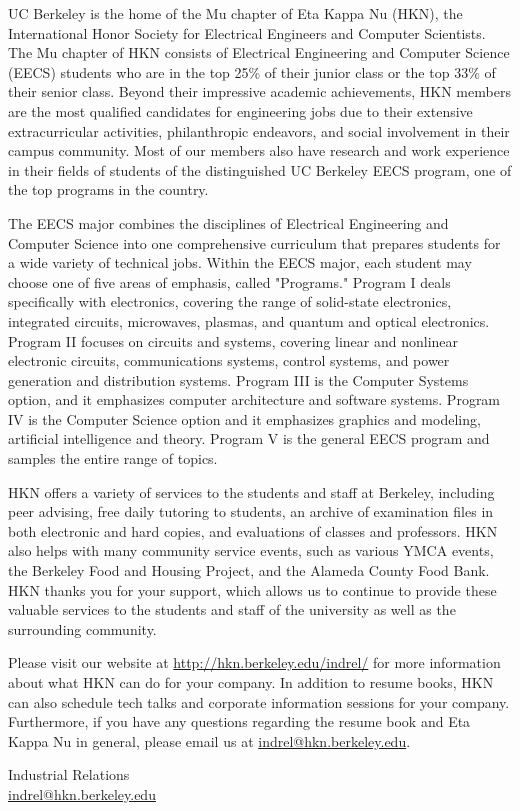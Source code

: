 \documentclass[11pt]{article}
\begin{document}
UC Berkeley is the home of the Mu chapter of Eta Kappa Nu (HKN), the International Honor Society
for Electrical Engineers and Computer Scientists. The Mu chapter of HKN consists of Electrical Engineering
and Computer Science (EECS) students who are in the top 25\% of their junior class or the top 33\% of their
senior class. Beyond their impressive academic achievements, HKN members are the most qualified
candidates for engineering jobs due to their extensive extracurricular activities, philanthropic endeavors,
and social involvement in their campus community. Most of our members also have research and work
experience in their fields of students of the distinguished UC Berkeley EECS program, one of the top
programs in the country.

The EECS major combines the disciplines of Electrical Engineering and Computer Science into one
comprehensive curriculum that prepares students for a wide variety of technical jobs. Within the EECS
major, each student may choose one of five areas of emphasis, called "Programs." Program I deals
specifically with electronics, covering the range of solid-state electronics, integrated circuits, microwaves,
plasmas, and quantum and optical electronics. Program II focuses on circuits and systems, covering linear
and nonlinear electronic circuits, communications systems, control systems, and power generation and
distribution systems. Program III is the Computer Systems option, and it emphasizes computer architecture
and software systems. Program IV is the Computer Science option and it emphasizes graphics and
modeling, artificial intelligence and theory. Program V is the general EECS program and samples the entire
range of topics.

HKN offers a variety of services to the students and staff at Berkeley, including peer advising, free
daily tutoring to students, an archive of examination files in both electronic and hard copies, and
evaluations of classes and professors. HKN also helps with many community service events, such as various
YMCA events, the Berkeley Food and Housing Project, and the Alameda County Food Bank. HKN thanks you
for your support, which allows us to continue to provide these valuable services to the students and staff of
the university as well as the surrounding community. 

Please visit our website at \url{http://hkn.berkeley.edu/indrel/} for more information about what HKN
can do for your company. In addition to resume books, HKN can also schedule tech talks and corporate
information sessions for your company. Furthermore, if you have any questions regarding the resume book
and Eta Kappa Nu in general, please email us at \url{indrel@hkn.berkeley.edu}. 
	\begin{list}{}{\setlength{\itemsep}{-2mm} \setlength{\leftmargin}{0pt}}
    {%
		\item {{name}}
    {%
	\end{list}
Industrial Relations \\
\url{indrel@hkn.berkeley.edu}
\end{document}
